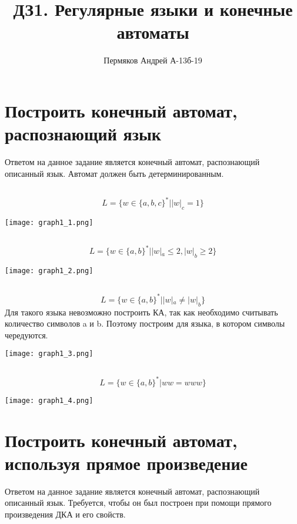 \documentclass[a4paper, 12pt]{article}
\author{Пермяков Андрей А-13б-19}
\title{ДЗ1. Регулярные языки и конечные автоматы}
\date{}
\begin{document}
\maketitle

\section{Построить конечный автомат, распознающий язык}
Ответом на данное задание является конечный автомат, распознающий описанный язык. Автомат должен быть детерминированным.

\subsection{}
$$ L = \{w \in \{a,b,c\}^* | |w|_c = 1 \} $$
\begin{center}
    \texttt{[image: graph1\_1.png]}
\end{center}

\subsection{}
$$L = \{w \in \{a,b\}^* | |w|_a \leq 2, |w|_b \geq 2 \}$$
\begin{center}
    \texttt{[image: graph1\_2.png]}
\end{center}

\subsection{}
$$L = \{w \in \{a,b\}^* | |w|_a \neq |w|_b \}$$
Для такого языка невозможно построить КА, так как необходимо считывать количество символов a и b. Поэтому построим для языка, в котором символы чередуются.
\begin{center}
    \texttt{[image: graph1\_3.png]}
\end{center}

\subsection{}
$$L = \{w \in \{a,b\}^* | ww = www \}$$
\begin{center}
    \texttt{[image: graph1\_4.png]}
\end{center}


\section{Построить конечный автомат, используя прямое произведение}
Ответом на данное задание является конечный автомат, распознающий описанный язык. Требуется, чтобы он был построен при помощи прямого произведения ДКА и его свойств.
\end{document}
